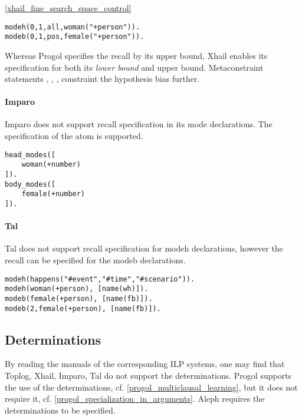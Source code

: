 \begin{exmp}\ref{xhail_fine_search_space_control}
\begin{lstlisting}
modeh(0,1,all,woman("+person")).
modeb(0,1,pos,female("+person")).
\end{lstlisting}
\end{exmp}

Whereas Progol specifies the recall by its upper bound, Xhail enables its specification for both its \emph{lower bound} and upper bound. Metaconstraint statements
, , ,  constraint the hypothesis bias further.

\paragraph{Imparo}\cite{kimber2013imparo}
Imparo does not support recall specification in its mode declarations. The specification of the atom is supported.
\begin{exmp}
\begin{lstlisting}
head_modes([
    woman(+number)
]).
body_modes([
    female(+number)
]).
\end{lstlisting}
\end{exmp}

\paragraph{Tal}
Tal does not support recall specification for modeh declarations, however the recall can be specified for the modeb declarations\cite{corapi2011tal}.
\begin{exmp}
\begin{lstlisting}
modeh(happens("#event","#time","#scenario")).
modeh(woman(+person), [name(wh)]).
modeb(female(+person), [name(fb)]).
modeb(2,female(+person), [name(fb)]).
\end{lstlisting}
\end{exmp}

\subsection{Determinations}\label{classification_determinations}
By reading the manuals of the corresponding ILP systems, one may find that
Toplog, Xhail, Imparo, Tal do not support the determinations.
Progol supports the use of the determinations, cf. \ref{progol_multiclausal_learning}, but it does not require it, cf. \ref{progol_specialization_in_arguments}.
Aleph requires the determinations to be specified.

